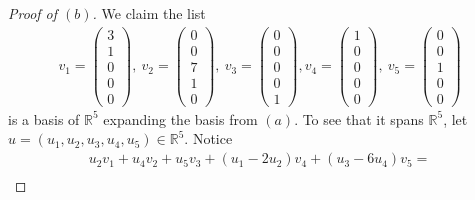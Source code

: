 \documentclass{extarticle}
\newcommand{\R}{\mathbb{R}}
\begin{document}
\begin{proof}[Proof of $(b)$]
We claim the list 
\begin{align*}
v_1 = \begin{pmatrix}3\\1\\0\\0\\0\end{pmatrix}, ~ v_2 = \begin{pmatrix}0\\0\\7\\1\\0\end{pmatrix}, ~ v_3 = \begin{pmatrix}0\\0\\0\\0\\1\end{pmatrix}, v_4 = \begin{pmatrix}1\\0\\0\\0\\0\end{pmatrix}, ~v_5 = \begin{pmatrix}0\\0\\1\\0\\0\end{pmatrix}
\end{align*}
is a basis of $\R^5$ expanding the basis from $(a)$.  To see that it spans $\R^5$, let $u=(u_1,u_2,u_3,u_4,u_5)\in\R^5$.  Notice 
\begin{multline*}
u_2v_1 + u_4v_2 + u_5v_3+ (u_1 - 2u_2)v_4 + (u_3 - 6u_4)v_5 = \\

\end{multline*}
\end{proof}
\end{document}
